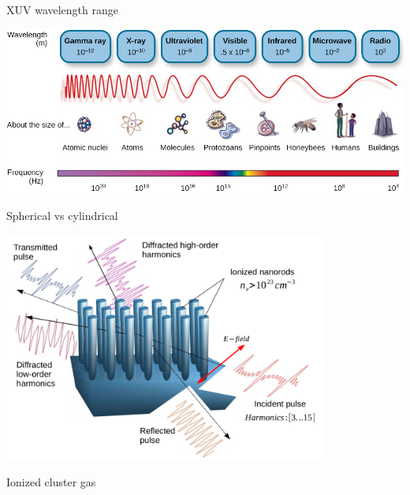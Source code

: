 \documentclass[10pt,xcolor=svgnames]{beamer} %
\begin{document}
\begin{frame}[fragile]{XUV wavelength range}\
    \begin{center}
        \includegraphics[width=1.\textwidth]{../components/img/CNX_Psych_05_02_Spectrum.jpg}
    \end{center}
\end{frame}

\begin{frame}[fragile]{Spherical vs cylindrical}
    \begin{center}
        \includegraphics[width=0.8\textwidth]{../components/img/cyl_spsp.png}
    \end{center}
\end{frame}


\begin{frame}[fragile]{Ionized cluster gas} %
\end{frame}
\end{document}
